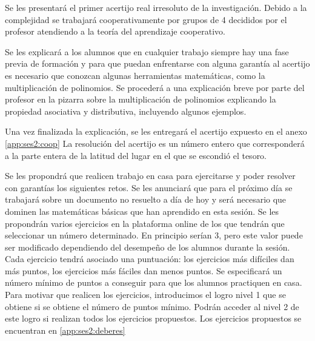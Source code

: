 Se les presentará el primer acertijo real irresoluto de la investigación.
%
Debido a la complejidad se trabajará cooperativamente por grupos de 4 decididos por el profesor atendiendo a la teoría del aprendizaje cooperativo. 

Se les explicará a los alumnos que en cualquier trabajo siempre hay una fase previa de formación y para que puedan enfrentarse con alguna garantía al acertijo es necesario que conozcan algunas herramientas matemáticas, como la multiplicación de polinomios.
%
Se procederá a una explicación breve por parte del profesor en la pizarra sobre la multiplicación de polinomios explicando la propiedad asociativa y distributiva, incluyendo algunos ejemplos.

Una vez finalizada la explicación, se les entregará el acertijo expuesto en el anexo \ref{app:ses2:coop}
%
La resolución del acertijo es un número entero que corresponderá a la parte entera de la latitud del lugar en el que se escondió el tesoro.



Se les propondrá que realicen trabajo en casa para ejercitarse y poder resolver con garantías los siguientes retos.
%
Se les anunciará que para el próximo día se trabajará sobre un documento no resuelto a día de hoy y será necesario que dominen las matemáticas básicas que han aprendido en esta sesión.
%
Se les propondrán varios ejercicios en la plataforma online de los que tendrán que seleccionar un número determinado. 
%
En principio serían 3, pero este valor puede ser modificado dependiendo del desempeño de los alumnos durante la sesión.
%
Cada ejercicio tendrá asociado una puntuación: los ejercicios más difíciles dan más puntos, los ejercicios más fáciles dan menos puntos.
%
Se especificará un número mínimo de puntos a conseguir para que los alumnos practiquen en casa. 
%
Para motivar que realicen los ejercicios, introducimos el logro  nivel 1 que se obtiene si se obtiene el número de puntos mínimo.
%
Podrán acceder al nivel 2 de este logro si realizan todos los ejercicios propuestos.
%
Los ejercicios propuestos se encuentran en \ref{app:ses2:deberes}

